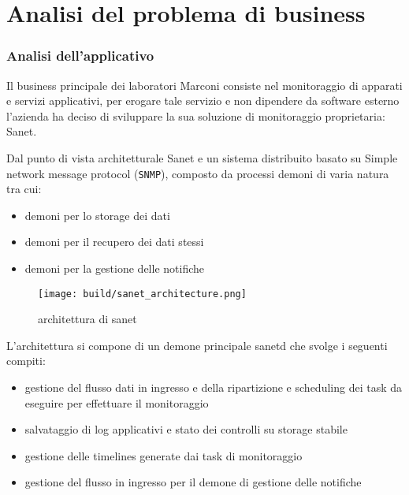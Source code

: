 \documentclass[12pt,a4paper,twoside,openright]{book}
\begin{document}
\chapter{Analisi del problema di business}

\subsection{Analisi dell'applicativo}

Il business principale dei laboratori Marconi consiste nel monitoraggio di apparati e servizi applicativi, per erogare tale servizio e non dipendere da software esterno l'azienda ha deciso di sviluppare la sua soluzione di monitoraggio proprietaria: Sanet.

Dal punto di vista architetturale Sanet e un sistema distribuito basato su Simple network message protocol (\verb|SNMP|), composto da processi demoni di varia natura tra cui:

\begin{itemize}
    \item demoni per lo storage dei dati
    \item demoni per il recupero dei dati stessi
    \item demoni per la gestione delle notifiche
\end{itemize}

\begin{figure}[H]
    \centering
    \texttt{[image: build/sanet\_architecture.png]}
    \caption{architettura di sanet}
    \label{fig:enter-label}
\end{figure}

L'architettura si compone di un demone principale sanetd che svolge i seguenti compiti:

\begin{itemize}
  \item gestione del flusso dati in ingresso e della ripartizione e scheduling dei task da eseguire per effettuare il monitoraggio
  \item salvataggio di log applicativi e stato dei controlli su storage stabile
  \item gestione delle timelines generate dai task di monitoraggio
  \item gestione del flusso in ingresso per il demone di gestione delle notifiche
\end{itemize}
\end{document}
